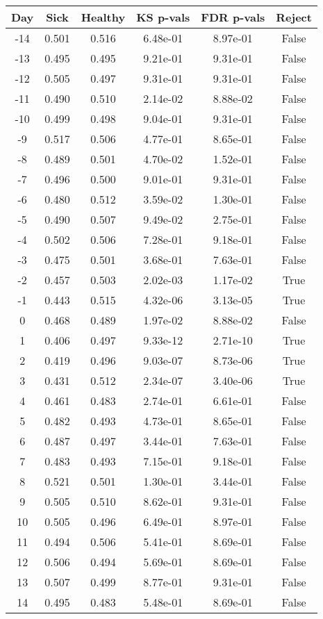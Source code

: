 \begin{tabular}{c|c|c|c|c|c}
Day &  Sick & Healthy &  KS p-vals & FDR p-vals & Reject\\
\hline
-14 & 0.501 &   0.516 &   6.48e-01 &   8.97e-01 &  False\\
-13 & 0.495 &   0.495 &   9.21e-01 &   9.31e-01 &  False\\
-12 & 0.505 &   0.497 &   9.31e-01 &   9.31e-01 &  False\\
-11 & 0.490 &   0.510 &   2.14e-02 &   8.88e-02 &  False\\
-10 & 0.499 &   0.498 &   9.04e-01 &   9.31e-01 &  False\\
 -9 & 0.517 &   0.506 &   4.77e-01 &   8.65e-01 &  False\\
 -8 & 0.489 &   0.501 &   4.70e-02 &   1.52e-01 &  False\\
 -7 & 0.496 &   0.500 &   9.01e-01 &   9.31e-01 &  False\\
 -6 & 0.480 &   0.512 &   3.59e-02 &   1.30e-01 &  False\\
 -5 & 0.490 &   0.507 &   9.49e-02 &   2.75e-01 &  False\\
 -4 & 0.502 &   0.506 &   7.28e-01 &   9.18e-01 &  False\\
 -3 & 0.475 &   0.501 &   3.68e-01 &   7.63e-01 &  False\\
 -2 & 0.457 &   0.503 &   2.02e-03 &   1.17e-02 &   True\\
 -1 & 0.443 &   0.515 &   4.32e-06 &   3.13e-05 &   True\\
  0 & 0.468 &   0.489 &   1.97e-02 &   8.88e-02 &  False\\
  1 & 0.406 &   0.497 &   9.33e-12 &   2.71e-10 &   True\\
  2 & 0.419 &   0.496 &   9.03e-07 &   8.73e-06 &   True\\
  3 & 0.431 &   0.512 &   2.34e-07 &   3.40e-06 &   True\\
  4 & 0.461 &   0.483 &   2.74e-01 &   6.61e-01 &  False\\
  5 & 0.482 &   0.493 &   4.73e-01 &   8.65e-01 &  False\\
  6 & 0.487 &   0.497 &   3.44e-01 &   7.63e-01 &  False\\
  7 & 0.483 &   0.493 &   7.15e-01 &   9.18e-01 &  False\\
  8 & 0.521 &   0.501 &   1.30e-01 &   3.44e-01 &  False\\
  9 & 0.505 &   0.510 &   8.62e-01 &   9.31e-01 &  False\\
 10 & 0.505 &   0.496 &   6.49e-01 &   8.97e-01 &  False\\
 11 & 0.494 &   0.506 &   5.41e-01 &   8.69e-01 &  False\\
 12 & 0.506 &   0.494 &   5.69e-01 &   8.69e-01 &  False\\
 13 & 0.507 &   0.499 &   8.77e-01 &   9.31e-01 &  False\\
 14 & 0.495 &   0.483 &   5.48e-01 &   8.69e-01 &  False\\
\end{tabular}